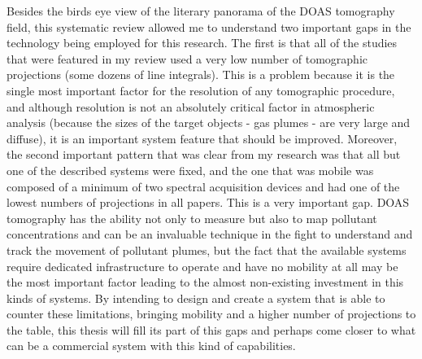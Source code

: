 Besides the birds eye view of the literary panorama of the DOAS
tomography field, this systematic review allowed me to understand two
important gaps in the technology being employed for this research. The
first is that all of the studies that were featured in my review used a
very low number of tomographic projections (some dozens of line
integrals). This is a problem because it is the single most important
factor for the resolution of any tomographic procedure, and although
resolution is not an absolutely critical factor in atmospheric analysis
(because the sizes of the target objects - gas plumes - are very large
and diffuse), it is an important system feature that should be improved.
Moreover, the second important pattern that was clear from my research
was that all but one of the described systems were fixed, and the one
that was mobile was composed of a minimum of two spectral acquisition
devices and had one of the lowest numbers of projections in all papers.
This is a very important gap. DOAS tomography has the ability not only
to measure but also to map pollutant concentrations and can be an
invaluable technique in the fight to understand and track the movement
of pollutant plumes, but the fact that the available systems require
dedicated infrastructure to operate and have no mobility at all may be
the most important factor leading to the almost non-existing investment
in this kinds of systems. By intending to design and create a system
that is able to counter these limitations, bringing mobility and a
higher number of projections to the table, this thesis will fill its
part of this gaps and perhaps come closer to what can be a commercial
system with this kind of capabilities.






